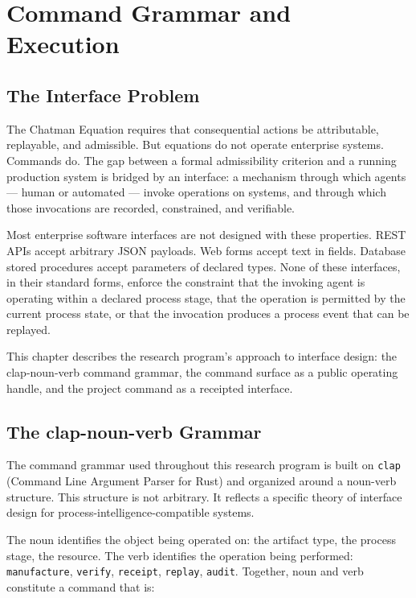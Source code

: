 \chapter{Command Grammar and Execution}
\label{chap:command_grammar}

\section{The Interface Problem}

The Chatman Equation requires that consequential actions be attributable, replayable, and admissible. But equations do not operate enterprise systems. Commands do. The gap between a formal admissibility criterion and a running production system is bridged by an interface: a mechanism through which agents --- human or automated --- invoke operations on systems, and through which those invocations are recorded, constrained, and verifiable.

Most enterprise software interfaces are not designed with these properties. REST APIs accept arbitrary JSON payloads. Web forms accept text in fields. Database stored procedures accept parameters of declared types. None of these interfaces, in their standard forms, enforce the constraint that the invoking agent is operating within a declared process stage, that the operation is permitted by the current process state, or that the invocation produces a process event that can be replayed.

This chapter describes the research program's approach to interface design: the clap-noun-verb command grammar, the command surface as a public operating handle, and the project command as a receipted interface.

\section{The clap-noun-verb Grammar}

The command grammar used throughout this research program is built on \texttt{clap} (Command Line Argument Parser for Rust) and organized around a noun-verb structure. This structure is not arbitrary. It reflects a specific theory of interface design for process-intelligence-compatible systems.

The noun identifies the object being operated on: the artifact type, the process stage, the resource. The verb identifies the operation being performed: \texttt{manufacture}, \texttt{verify}, \texttt{receipt}, \texttt{replay}, \texttt{audit}. Together, noun and verb constitute a command that is:

